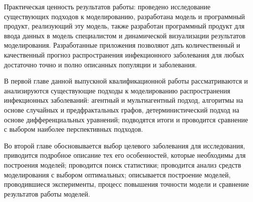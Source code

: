 Практическая ценность результатов работы: проведено исследование существующих подходов к моделированию,	разработана модель  и программный продукт, реализующий эту модель, также разработан программный продукт для ввода данных в модель специалистом и динамической визуализации результатов моделирования. Разработанные приложения позволяют дать количественный и качественный прогноз распространения инфекционного заболевания для любых  достаточно точно и полно описанных популяции и заболевания.

В первой главе данной выпускной квалификационной работы рассматриваются и анализируются существующие подходы к моделированию распространения инфекционных заболеваний: агентный и мультиагентный подход, алгоритмы на основе случайных  и предфрактальных графов, детерминистический подход на основе дифференциальных уравнений; подводятся итоги и проводится сравнение с выбором наиболее перспективных подходов.

Во второй главе обосновывается выбор целевого заболевания для исследования, приводится подробное описание тех его особенностей, которые необходимы для построения моделей; проводится поиск статистики; проводится анализ средств моделирования с выбором оптимальных; описывается построение моделей, проводившиеся эксперименты, процесс повышения точности модели  и сравнение результатов работы моделей.
